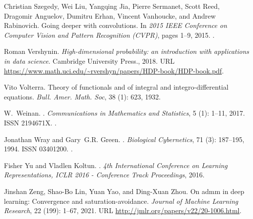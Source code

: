 \documentclass[twoside,11pt]{article}
\begin{document}
\begin{thebibliography}{36}
Christian Szegedy, Wei Liu, Yangqing Jia, Pierre Sermanet, Scott Reed, Dragomir
  Anguelov, Dumitru Erhan, Vincent Vanhoucke, and Andrew Rabinovich.
\newblock Going deeper with convolutions.
\newblock In \emph{2015 IEEE Conference on Computer Vision and Pattern
  Recognition (CVPR)}, pages 1--9, 2015.
\newblock {}.

Roman Vershynin.
\newblock \emph{High-dimensional probability: an introduction with applications
  in data science}.
\newblock Cambridge University Press., 2018.
\newblock URL
  \url{https://www.math.uci.edu/~rvershyn/papers/HDP-book/HDP-book.pdf}.

Vito Volterra.
\newblock Theory of functionals and of integral and integro-differential
  equations.
\newblock \emph{Bull. Amer. Math. Soc}, 38 (1): 623, 1932.

W.~Weinan.
.
\newblock \emph{Communications in Mathematics and Statistics}, 5
  (1): 1--11, 2017.
\newblock ISSN 2194671X.
\newblock {}.

Jonathan Wray and Gary~G.R. Green.
.
\newblock \emph{Biological Cybernetics}, 71 (3): 187--195,
  1994.
\newblock ISSN 03401200.
\newblock {}.

Fisher Yu and Vladlen Koltun.
.
\newblock \emph{4th International Conference on Learning Representations, ICLR
  2016 - Conference Track Proceedings}, 2016.

Jinshan Zeng, Shao-Bo Lin, Yuan Yao, and Ding-Xuan Zhou.
\newblock On admm in deep learning: Convergence and saturation-avoidance.
\newblock \emph{Journal of Machine Learning Research}, 22
  (199): 1--67, 2021.
\newblock URL \url{http://jmlr.org/papers/v22/20-1006.html}.

\end{thebibliography}
\end{document}
